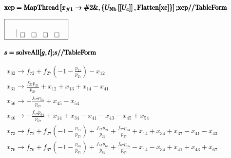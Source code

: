 \documentclass{article}
\newcommand{\unicode}[1]{{}}
\begin{document}
\begin{doublespace}
\noindent\(\pmb{\text{xcp}=\text{MapThread}\left[x_{\text{$\#$1}}\to \text{$\#$2}\&,\left\{U_{\text{Nb}}\left[\left[U_c\right]\right],\text{Flatten}[\text{xc}]\right\}\right];}\\
\pmb{\text{xcp}\text{//}\text{TableForm}}\)
\end{doublespace}

\begin{doublespace}
\noindent\(\fbox{$
\begin{array}{l}
  \\
 
\begin{array}{c|cccc}
  & \fbox{$\text{}$} & \fbox{$\text{}$} & \fbox{$\text{}$} & \fbox{$\text{}$} \\
\end{array}
 \\
\end{array}
$}\)
\end{doublespace}

\begin{doublespace}
\noindent\(\pmb{s=\text{solveAll}[g,t];}\\
\pmb{s\text{//}\text{TableForm}}\)
\end{doublespace}

\begin{doublespace}
\noindent\(\begin{array}{l}
 x_{3\unicode{f3d5}2}\to f_{7\unicode{f3d5}2}+f_{2\unicode{f3d5}7} \left(-1-\frac{p_{2\unicode{f3d5}1}}{p_{2\unicode{f3d5}7}}\right)-x_{1\unicode{f3d5}2}
\\
 x_{3\unicode{f3d5}1}\to \frac{f_{2\unicode{f3d5}7} p_{2\unicode{f3d5}1}}{p_{2\unicode{f3d5}7}}+x_{1\unicode{f3d5}2}+x_{1\unicode{f3d5}3}+x_{1\unicode{f3d5}4}-x_{4\unicode{f3d5}1}
\\
 x_{5\unicode{f3d5}6}\to -\frac{f_{6\unicode{f3d5}7} p_{6\unicode{f3d5}5}}{p_{6\unicode{f3d5}7}}+x_{4\unicode{f3d5}5}-x_{5\unicode{f3d5}4} \\
 x_{4\unicode{f3d5}6}\to -\frac{f_{6\unicode{f3d5}7} p_{6\unicode{f3d5}4}}{p_{6\unicode{f3d5}7}}+x_{1\unicode{f3d5}4}+x_{3\unicode{f3d5}4}-x_{4\unicode{f3d5}1}-x_{4\unicode{f3d5}3}-x_{4\unicode{f3d5}5}+x_{5\unicode{f3d5}4}
\\
 x_{7\unicode{f3d5}3}\to f_{7\unicode{f3d5}2}+f_{2\unicode{f3d5}7} \left(-1-\frac{p_{2\unicode{f3d5}1}}{p_{2\unicode{f3d5}7}}\right)+\frac{f_{2\unicode{f3d5}7}
p_{2\unicode{f3d5}1}}{p_{2\unicode{f3d5}7}}+\frac{f_{2\unicode{f3d5}7} p_{2\unicode{f3d5}3}}{p_{2\unicode{f3d5}7}}+x_{1\unicode{f3d5}4}+x_{3\unicode{f3d5}4}+x_{3\unicode{f3d5}7}-x_{4\unicode{f3d5}1}-x_{4\unicode{f3d5}3}
\\
 x_{7\unicode{f3d5}6}\to f_{7\unicode{f3d5}6}+f_{6\unicode{f3d5}7} \left(-1-\frac{p_{6\unicode{f3d5}5}}{p_{6\unicode{f3d5}7}}\right)+\frac{f_{6\unicode{f3d5}7}
p_{6\unicode{f3d5}4}}{p_{6\unicode{f3d5}7}}+\frac{f_{6\unicode{f3d5}7} p_{6\unicode{f3d5}5}}{p_{6\unicode{f3d5}7}}-x_{1\unicode{f3d5}4}-x_{3\unicode{f3d5}4}+x_{4\unicode{f3d5}1}+x_{4\unicode{f3d5}3}+x_{6\unicode{f3d5}7}
\\
\end{array}\)
\end{doublespace}
\end{document}
